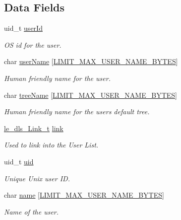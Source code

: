 \subsection*{Data Fields}
\begin{DoxyCompactItemize}
\item 
uid\+\_\+t \hyperlink{struct_user__t_abed6504aa2662c12e5e2808c3a80f0f8}{user\+Id}
\begin{DoxyCompactList}\small\item\em OS id for the user. \end{DoxyCompactList}\item 
char \hyperlink{struct_user__t_a979a46d6eb674114d1ac1b890d71b0fc}{user\+Name} \mbox{[}\hyperlink{limit_8h_a6edbf14b38ca141c9e2a6edef24e44bf}{L\+I\+M\+I\+T\+\_\+\+M\+A\+X\+\_\+\+U\+S\+E\+R\+\_\+\+N\+A\+M\+E\+\_\+\+B\+Y\+T\+ES}\mbox{]}
\begin{DoxyCompactList}\small\item\em Human friendly name for the user. \end{DoxyCompactList}\item 
char \hyperlink{struct_user__t_a78c367f8581be8d7730d6872ce62f038}{tree\+Name} \mbox{[}\hyperlink{limit_8h_a6edbf14b38ca141c9e2a6edef24e44bf}{L\+I\+M\+I\+T\+\_\+\+M\+A\+X\+\_\+\+U\+S\+E\+R\+\_\+\+N\+A\+M\+E\+\_\+\+B\+Y\+T\+ES}\mbox{]}
\begin{DoxyCompactList}\small\item\em Human friendly name for the user\textquotesingle{}s default tree. \end{DoxyCompactList}\item 
\hyperlink{structle__dls___link__t}{le\+\_\+dls\+\_\+\+Link\+\_\+t} \hyperlink{struct_user__t_a8a9876bfe48c8f39c527fbb1e0faa57f}{link}
\begin{DoxyCompactList}\small\item\em Used to link into the User List. \end{DoxyCompactList}\item 
uid\+\_\+t \hyperlink{struct_user__t_a70214a251b71042f97f742d4479c0898}{uid}
\begin{DoxyCompactList}\small\item\em Unique Unix user ID. \end{DoxyCompactList}\item 
char \hyperlink{struct_user__t_afde94960ea9b8f7a8ec21586fed6ec76}{name} \mbox{[}\hyperlink{limit_8h_a6edbf14b38ca141c9e2a6edef24e44bf}{L\+I\+M\+I\+T\+\_\+\+M\+A\+X\+\_\+\+U\+S\+E\+R\+\_\+\+N\+A\+M\+E\+\_\+\+B\+Y\+T\+ES}\mbox{]}
\begin{DoxyCompactList}\small\item\em Name of the user. \end{DoxyCompactList}\item 

\end{DoxyCompactItemize}
